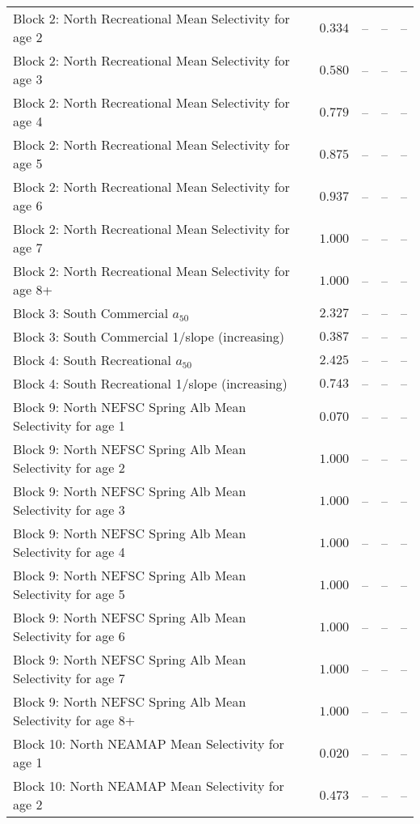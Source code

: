 \documentclass[
]{article}
\begin{document}
\begin{landscape}
\begin{longtable}[t]{lrrrr}
\addlinespace
Block 2: North Recreational Mean Selectivity for age 2 & $0.334$ & -- & -- & --\\
Block 2: North Recreational Mean Selectivity for age 3 & $0.580$ & -- & -- & --\\
Block 2: North Recreational Mean Selectivity for age 4 & $0.779$ & -- & -- & --\\
Block 2: North Recreational Mean Selectivity for age 5 & $0.875$ & -- & -- & --\\
Block 2: North Recreational Mean Selectivity for age 6 & $0.937$ & -- & -- & --\\
\addlinespace
Block 2: North Recreational Mean Selectivity for age 7 & $1.000$ & -- & -- & --\\
Block 2: North Recreational Mean Selectivity for age 8+ & $1.000$ & -- & -- & --\\
Block 3: South Commercial $a_{50}$ & $2.327$ & -- & -- & --\\
Block 3: South Commercial 1/slope (increasing) & $0.387$ & -- & -- & --\\
Block 4: South Recreational $a_{50}$ & $2.425$ & -- & -- & --\\
\addlinespace
Block 4: South Recreational 1/slope (increasing) & $0.743$ & -- & -- & --\\
Block 9: North NEFSC Spring Alb Mean Selectivity for age 1 & $0.070$ & -- & -- & --\\
Block 9: North NEFSC Spring Alb Mean Selectivity for age 2 & $1.000$ & -- & -- & --\\
Block 9: North NEFSC Spring Alb Mean Selectivity for age 3 & $1.000$ & -- & -- & --\\
Block 9: North NEFSC Spring Alb Mean Selectivity for age 4 & $1.000$ & -- & -- & --\\
\addlinespace
Block 9: North NEFSC Spring Alb Mean Selectivity for age 5 & $1.000$ & -- & -- & --\\
Block 9: North NEFSC Spring Alb Mean Selectivity for age 6 & $1.000$ & -- & -- & --\\
Block 9: North NEFSC Spring Alb Mean Selectivity for age 7 & $1.000$ & -- & -- & --\\
Block 9: North NEFSC Spring Alb Mean Selectivity for age 8+ & $1.000$ & -- & -- & --\\
Block 10: North NEAMAP Mean Selectivity for age 1 & $0.020$ & -- & -- & --\\
\addlinespace
Block 10: North NEAMAP Mean Selectivity for age 2 & $0.473$ & -- & -- & --\\

\end{longtable}
\end{landscape}
\end{document}
